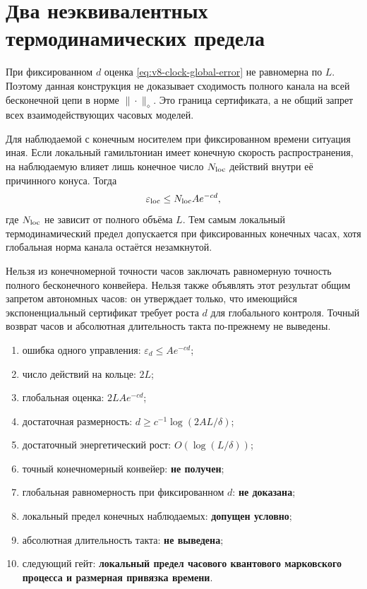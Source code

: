 \section{Два неэквивалентных термодинамических предела}

При фиксированном $d$ оценка \eqref{eq:v8-clock-global-error} не равномерна
по $L$. Поэтому данная конструкция не доказывает сходимость полного канала
на всей бесконечной цепи в норме $\|\cdot\|_\diamond$. Это граница
сертификата, а не общий запрет всех взаимодействующих часовых моделей.

Для наблюдаемой с конечным носителем при фиксированном времени ситуация
иная. Если локальный гамильтониан имеет конечную скорость распространения,
на наблюдаемую влияет лишь конечное число $N_{\rm loc}$ действий внутри её
причинного конуса. Тогда
\begin{equation}
 \varepsilon_{\rm loc}\leq N_{\rm loc}Ae^{-cd},
 \label{eq:v8-clock-local-observable-error}
\end{equation}
где $N_{\rm loc}$ не зависит от полного объёма $L$. Тем самым локальный
термодинамический предел допускается при фиксированных конечных часах,
хотя глобальная норма канала остаётся незамкнутой.

\begin{nogocriterion}
Нельзя из конечномерной точности часов заключать равномерную точность
полного бесконечного конвейера. Нельзя также объявлять этот результат
общим запретом автономных часов: он утверждает только, что имеющийся
экспоненциальный сертификат требует роста $d$ для глобального контроля.
Точный возврат часов и абсолютная длительность такта по-прежнему не
выведены.
\end{nogocriterion}

\begin{protocol}
\begin{enumerate}
 \item ошибка одного управления: \textbf{$\varepsilon_d\leq Ae^{-cd}$};
 \item число действий на кольце: \textbf{$2L$};
 \item глобальная оценка: \textbf{$2LAe^{-cd}$};
 \item достаточная размерность: \textbf{$d\geq c^{-1}\log(2AL/\delta)$};
 \item достаточный энергетический рост: \textbf{$O(\log(L/\delta))$};
 \item точный конечномерный конвейер: \textbf{не получен};
 \item глобальная равномерность при фиксированном $d$: \textbf{не доказана};
 \item локальный предел конечных наблюдаемых: \textbf{допущен условно};
 \item абсолютная длительность такта: \textbf{не выведена};
 \item следующий гейт: \textbf{локальный предел часового квантового
 марковского процесса и размерная привязка времени}.
\end{enumerate}
\end{protocol}

